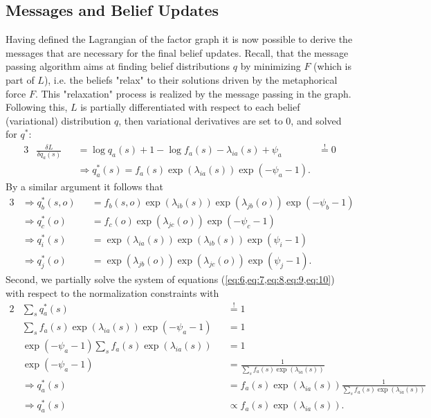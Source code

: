 \subsection{Messages and Belief Updates}

Having defined the Lagrangian of the factor graph it is now possible to derive the messages that are necessary for the final belief updates. Recall, that the message passing algorithm aims at finding belief distributions \(q\) by minimizing \(F\) (which is part of \(L\)), i.e. the beliefs "relax" to their solutions driven by the metaphorical force \(F\). This "relaxation" process is realized by the message passing in the graph. Following this, \(L\) is partially differentiated with respect to each belief (variational) distribution \(q\), then variational derivatives are set to \(0\), and solved for \(q^*\):
\begin{alignat}{3}
     & \frac{\delta L}{\delta q_a(s)} &  & = \log q_a(s) + 1 - \log f_a(s) - \lambda_{ia}(s) + \psi_a             & \overset{!}{=} 0 \\
     &                                &  & \Rightarrow q_a^*(s) = f_a(s) \exp(\lambda_{ia}(s)) \exp(-\psi_a - 1). & \label{eq:6}
\end{alignat}
By a similar argument it follows that
\begin{alignat}{3}
     & \Rightarrow q_b^*(s,o) &  & = f_b(s,o) \exp(\lambda_{ib}(s)) \exp(\lambda_{jb}(o)) \exp(-\psi_b - 1)                & \label{eq:7} \\
     & \Rightarrow q_c^*(o)   &  & = f_c(o) \exp(\lambda_{jc}(o)) \exp(-\psi_c - 1)                           \label{eq:8}                \\
     & \Rightarrow q_i^*(s)   &  & = \exp(\lambda_{ia}(s)) \exp(\lambda_{ib}(s)) \exp(\psi_i - 1)             \label{eq:9}                \\
     & \Rightarrow q_j^*(o)   &  & = \exp(\lambda_{jb}(o)) \exp(\lambda_{jc}(o)) \exp(\psi_j - 1).\label{eq:10}
\end{alignat}
Second, we partially solve the system of equations (\cref{eq:6,eq:7,eq:8,eq:9,eq:10}) with respect to the normalization constraints with
\begin{alignat}{2}
     & \sum_s q_a^*(s)                                       &  & \overset{!}{=} 1                                                             \\
     & \sum_s f_a(s) \exp(\lambda_{ia}(s)) \exp(-\psi_a - 1) &  & = 1                                                                          \\
     & \exp(-\psi_a - 1) \sum_s f_a(s) \exp(\lambda_{ia}(s)) &  & = 1                                                                          \\
     & \exp(-\psi_a - 1)                                     &  & = \frac{1}{\sum_s f_a(s) \exp(\lambda_{ia}(s))}                              \\
     & \Rightarrow q_a^*(s)                                  &  & = f_a(s) \exp(\lambda_{ia}(s)) \frac{1}{\sum_s f_a(s) \exp(\lambda_{ia}(s))} \label{eq:54}\\
     & \Rightarrow q_a^*(s)                                  &  & \propto f_a(s) \exp(\lambda_{ia}(s)). \label{eq:1}
\end{alignat}
